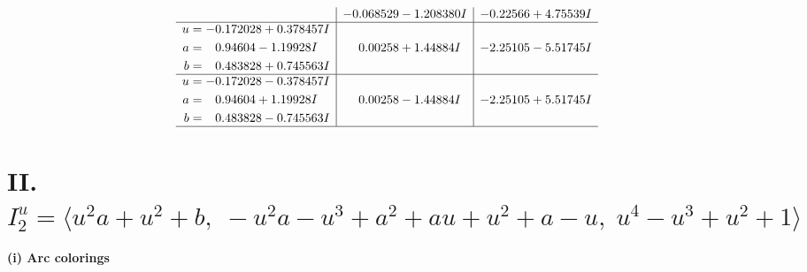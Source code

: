 \documentclass[1p]{elsarticle_modified}
\theoremstyle{definition}
\begin{document}
$$\begin{array}{c|c|c}
 & -0.068529 - 1.208380 I & -0.22566 + 4.75539 I \\ \hline\begin{aligned}
u &= -0.172028 + 0.378457 I \\
a &= \phantom{-}0.94604 - 1.19928 I \\
b &= \phantom{-}0.483828 + 0.745563 I\end{aligned}
 & \phantom{-}0.00258 + 1.44884 I & -2.25105 - 5.51745 I \\ \hline\begin{aligned}
u &= -0.172028 - 0.378457 I \\
a &= \phantom{-}0.94604 + 1.19928 I \\
b &= \phantom{-}0.483828 - 0.745563 I\end{aligned}
 & \phantom{-}0.00258 - 1.44884 I & -2.25105 + 5.51745 I\\
 \hline 
 \end{array}$$\newpage\newpage\renewcommand{\arraystretch}{1}
\centering \section*{II. $I^u_{2}= \langle u^2 a+u^2+b,\;- u^2 a- u^3+a^2+a u+u^2+a- u,\;u^4- u^3+u^2+1 \rangle$}
\flushleft \textbf{(i) Arc colorings}\\
\end{document}
